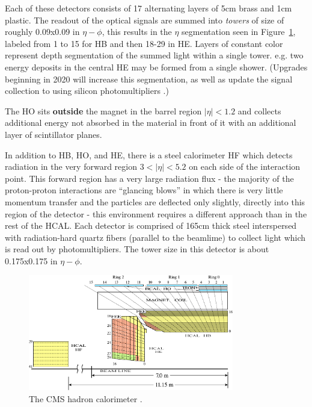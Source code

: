 Each of these detectors consists of 17 alternating layers of 5cm brass and 1cm plastic. The readout of the optical signals are summed into \textit{towers} of size of roughly 0.09x0.09 in $\eta-\phi$, this results in the $\eta$ segmentation seen in Figure~\ref{fig:hcal}, labeled from 1 to 15 for HB and then 18-29 in HE.  Layers of constant color represent depth segmentation of the summed light within a single tower.  e.g. two energy deposits in the central HE may be formed from a single shower. (Upgrades beginning in 2020 will increase this segmentation, as well as update the signal collection to using silicon photomultipliers  \cite{hcalupgrade}.)

The HO sits \textbf{outside} the magnet in the barrel region $|\eta|<1.2$ and collects additional energy not absorbed in the material in front of it with an additional layer of scintillator planes.

In addition to HB, HO, and HE, there is a steel calorimeter HF which detects radiation in the very forward region $3<|\eta|<5.2$ on each side of the interaction point. This forward region has a very large radiation flux - the majority of the proton-proton interactions are ``glancing blows'' in which there is very little momentum transfer and the particles are deflected only slightly, directly into this region of the detector - this environment requires a different approach than in the rest of the HCAL. Each detector is comprised of 165cm thick steel interspersed with radiation-hard quartz fibers (parallel to the beamlime) to collect light which is read out by photomultipliers. The tower size in this detector is about 0.175x0.175 in $\eta-\phi$.

\begin{figure}
\centering
\includegraphics[width=0.8\textwidth]{figs/hcal.pdf}
\caption[The CMS hadron calorimeter.]{The CMS hadron calorimeter \cite{cosmichcal}.}
\label{fig:hcal}
\end{figure}

